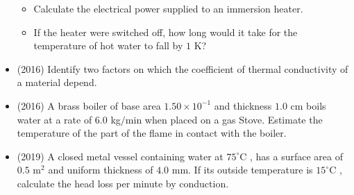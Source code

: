 \documentclass{article}
\begin{document}
\begin{itemize}
\begin{itemize}
\item Calculate the electrical power supplied to an immersion heater.
\item If the heater were switched off, how long would it take for the temperature of hot water to fall by $ 1$ K?
\end{itemize}
\item (2016)  Identify two factors on which the coefficient of thermal conductivity of a material depend.
\item (2016)  A brass boiler of base area $ 1.50\times 10^{-1}$ and thickness $ 1.0$ cm boils water at a rate of $ 6.0$ kg$/$min when placed on a gas Stove. Estimate the temperature of the part of the flame in contact with the boiler.
\item (2019)  A closed metal vessel containing water at $ 75^{\circ}$C , has a surface area of $ 0.5$ m$ ^{2}$ and uniform thickness of $ 4.0$ mm.  If its outside temperature is $ 15^{\circ}$C , calculate the head loss per minute by conduction.
\end{itemize}
\end{document}
